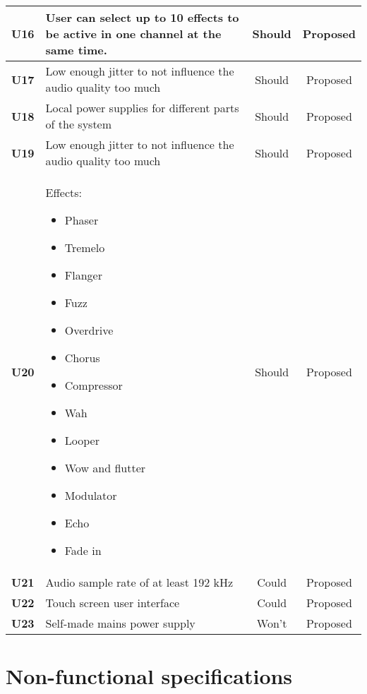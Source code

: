 \begin{longtable}{|c|p{10cm}|c|c|}
		\textbf{U16} & User can select up to 10 effects to be active in one channel at the same time. 								& Should & Proposed\\ \hline
		\textbf{U17} & Low enough jitter to not influence the audio quality too much 												& Should & Proposed\\ \hline
		\textbf{U18} & Local power supplies for different parts of the system 														& Should & Proposed\\ \hline
		\textbf{U19} & Low enough jitter to not influence the audio quality too much 												& Should & Proposed\\ \hline
		\textbf{U20} & Effects:\newline
		\begin{itemize}
			\setlength\itemsep{-0.3em}
			\item Phaser
			\item Tremelo
			\item Flanger
			\item Fuzz
			\item Overdrive
			\item Chorus
			\item Compressor
			\item Wah
			\item Looper
			\item Wow and flutter
			\item Modulator
			\item Echo
			\item Fade in
		\end{itemize}																												& Should & Proposed\\ \hline
		\textbf{U21} & Audio sample rate of at least 192 kHz 																		& Could  & Proposed\\ \hline
		\textbf{U22} & Touch screen user interface 																					& Could  & Proposed\\ \hline
		\textbf{U23} & Self-made mains power supply  																				& Won't  & Proposed\\ \hline
	\end{longtable}

    
\section{Non-functional specifications}


